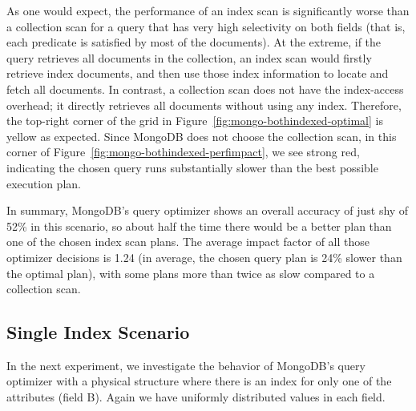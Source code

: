As one would expect,
the performance of an index scan is significantly 
worse than a collection scan for a query that has very high 
selectivity on both fields (that is, each predicate is satisfied by most of the documents). At the extreme, if the query retrieves all documents in the collection, an index scan would firstly
retrieve index documents, and then use those index information 
to locate and fetch all documents. In contrast, a collection
scan does not have the index-access overhead; it directly retrieves all
documents without using any index. Therefore, the top-right corner of the grid in Figure~\ref{fig:mongo-bothindexed-optimal} is yellow as expected. Since MongoDB does not choose the collection scan, in this corner of Figure~\ref{fig:mongo-bothindexed-perfimpact}, we see strong red, indicating the chosen query runs substantially slower than the best possible execution plan.

In summary, MongoDB's \approachName query optimizer shows an overall accuracy of just shy of 52\% %
in this scenario, so about half the time there would be a better plan than one of the chosen index scan plans.
The average impact factor of all those optimizer decisions is 1.24 (in average, the chosen query plan is 24\% slower than the optimal plan), with some plans more than twice as slow compared to a collection scan. 



\vspace*{-0.5\baselineskip}
\subsection{Single Index Scenario}
In the next experiment, we investigate the behavior of MongoDB's query optimizer with a physical structure where there is an index for only one of the attributes (field B). Again we have uniformly distributed values in each field.

